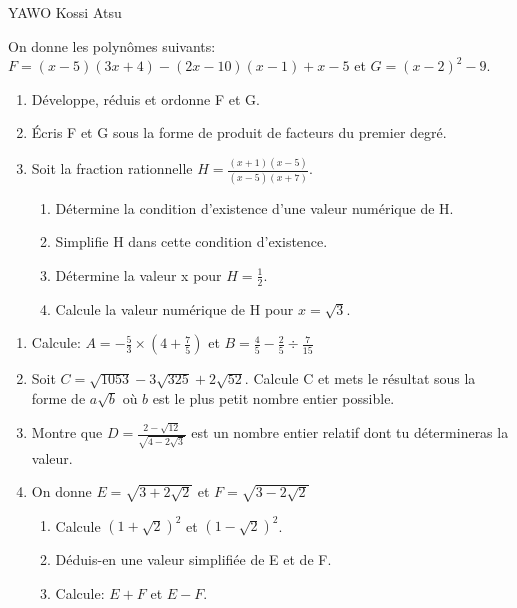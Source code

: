 \documentclass[12pt,a4paper]{book}
\author{YAWO Kossi Atsu}
\newcommand{\prof}{YAWO Kossi Atsu}
\begin{document}
\begin{revision}{\prof}
\begin{exo}
On donne les polynômes suivants: \\ 
$F=(x-5)(3x+4)-(2x-10)(x-1)+x-5$ \quad et \quad $G=(x-2)^2-9$.
\begin{enumerate}
\item Développe, réduis et ordonne F et G.
\item Écris F et G sous la forme de produit de facteurs du premier degré.
\item Soit la fraction rationnelle $H=\frac{(x+1)(x-5)}{(x-5)(x+7)}$.
\begin{enumerate}
\item Détermine la condition d'existence d'une valeur numérique de H.
\item Simplifie H dans cette condition d'existence.
\item Détermine la valeur x pour $H=\frac{1}{2}$.
\item Calcule la valeur numérique de H pour $x=\sqrt{3}$.
\end{enumerate}

\end{enumerate}
\end{exo}

\vspace{0.3cm}

\begin{exo}
\begin{enumerate}
\item Calcule: $A=-\frac{5}{3}\times(4+\frac{7}{5})$ et $B=\frac{4}{5}-\frac{2}{5} \div \frac{7}{15}$
\item Soit $C=\sqrt{1053}-3\sqrt{325}+2\sqrt{52}$. Calcule C et mets le résultat sous la forme de $a\sqrt{b}$ où $b$ est le plus petit nombre entier possible.
\item Montre que $D=\frac{2-\sqrt{12}}{\sqrt{4-2\sqrt{3}}}$ est un nombre entier relatif dont tu détermineras la valeur.
\item On donne $E=\sqrt{3+2\sqrt{2}}$ et $F=\sqrt{3-2\sqrt{2}}$
\begin{enumerate}
\item Calcule $(1+\sqrt{2})^2$ et $(1-\sqrt{2})^2$.
\item Déduis-en une valeur simplifiée de E et de F.
\item Calcule: $E+F$ et $E-F$.
\end{enumerate}
\end{enumerate}
\end{exo}


\end{revision}
\end{document}
